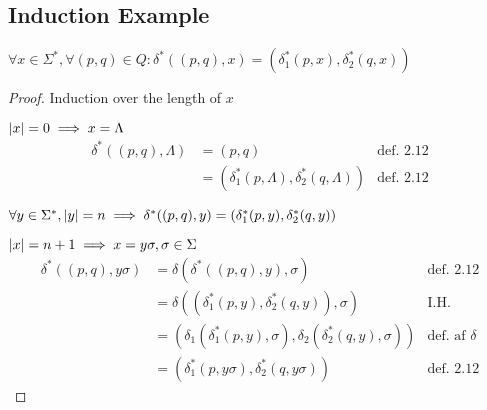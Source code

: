 \documentclass[a4, english, twoside]{article}
\begin{document}
\subsection{Induction Example}
\begin{lemma}[Martin 2.11]
    $\forall x \in \Sigma^* , \forall (p,q) \in Q: \delta^* ((p,q),x) = (\delta_1^* (p,x) , \delta_2^* (q,x))$
\end{lemma}
\begin{proof}
    \vspace{0.6em} \noindent
    Induction over the length of $x$

        $\left\lvert x \right\rvert = 0 \implies x = \Lambda$
        \begin{align*}
            \delta^*((p,q), \Lambda) &= (p,q)
                            &\text{def. 2.12}
        \\
                         &= (\delta_1^* (p,\Lambda) , \delta_2^* (q,\Lambda))
                             &\text{def. 2.12}
        \end{align*}

        $
            \forall y \in \Sigma^*, \left\lvert y \right\rvert = n
                \implies \delta^*((p,q), y) = (\delta_1^*(p,y), \delta_2^*(q,y))
        $
    
        $\left\lvert x \right\rvert = n+1 \implies x = y\sigma, \sigma \in \Sigma$
        \begin{align*}
            \delta^*((p,q),y\sigma) &= \delta(\delta^*((p,q),y),\sigma)
                                        &\text{def. 2.12}
        \\
                                     &= \delta((\delta_1^*(p,y), \delta_2^*(q,y)),\sigma)
                                         &\text{I.H.}
        \\
                                     &= (\delta_1(\delta_1^*(p,y),\sigma), \delta_2(\delta_2^*(q,y),\sigma))
                                         &\text{def. af } \delta
        \\
                                     &= (\delta_1^*(p,y\sigma), \delta_2^*(q,y\sigma))
                                         &\text{def. 2.12}
        \end{align*}
\end{proof}

\newpage
\end{document}
